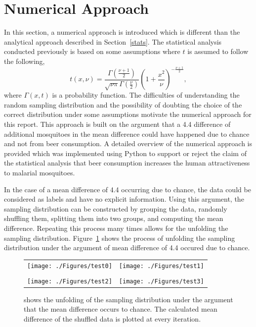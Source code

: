 \section{Numerical Approach}\label{computational}
In this section, a numerical approach is introduced which is different than the analytical approach described in Section~\ref{stats}. The statistical analysis conducted previously is based on some assumptions where $t$ is assumed to follow the following,
\begin{equation*}
  t(x,\nu) = \frac{\Gamma(\frac{\nu+1}{2})}{\sqrt{\nu\pi}\Gamma(\frac{\nu}{2})}\left(1 +\frac{x^2}{\nu} \right)^{-\frac{\nu+1}{2}},
\end{equation*}
where $\Gamma(x,t)$ is a probability function. The difficulties of understanding the random sampling distribution and the possibility of doubting the choice of the correct distribution under some assumptions motivate the numerical approach for this report. This approach is built on the argument that a 4.4 difference of additional mosquitoes in the mean difference could have happened due to chance and not from beer consumption. A detailed overview of the numerical approach is provided which was implemented using Python to support or reject the claim of the statistical analysis that beer consumption increases the human attractiveness to malarial mosquitoes.

In the case of a mean difference of 4.4 occurring due to chance, the data could be considered as labels and have no explicit information. Using this argument, the sampling distribution can be constructed by grouping the data, randomly shuffling them, splitting them into two groups, and computing the mean difference. Repeating this process many times allows for the unfolding  the sampling distribution. Figure~\ref{unfold} shows the process of unfolding the sampling distribution under the argument of mean difference of 4.4 occured due to chance.
\begin{figure}
  \centering
  \begin{tabular}{cc}
    \texttt{[image: ./Figures/test0]} & \texttt{[image: ./Figures/test1]} \\
     & \\
    \texttt{[image: ./Figures/test2]} & \texttt{[image: ./Figures/test3]} \\
  \end{tabular}
  \caption{shows the unfolding of the sampling distribution under the argument that the mean difference occurs to chance. The calculated mean difference of the shuffled data is plotted at every iteration.}\label{unfold}
\end{figure}

